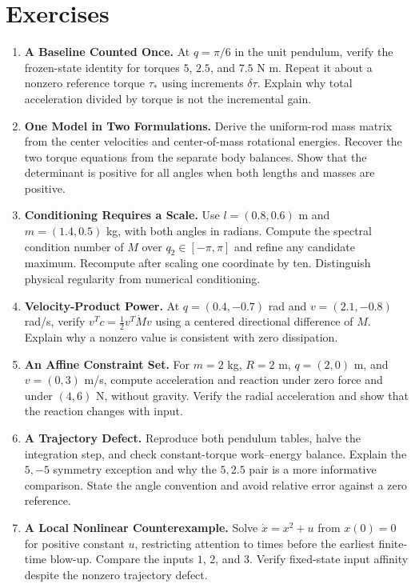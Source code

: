 \section{Exercises}

\begin{enumerate}
\item \textbf{A Baseline Counted Once.} At $q=\pi/6$ in the unit pendulum, verify the frozen-state identity for torques $5$, $2.5$, and $7.5$ N m. Repeat it about a nonzero reference torque $\tau_*$ using increments $\delta\tau$. Explain why total acceleration divided by torque is not the incremental gain.
\item \textbf{One Model in Two Formulations.} Derive the uniform-rod mass matrix from the center velocities and center-of-mass rotational energies. Recover the two torque equations from the separate body balances. Show that the determinant is positive for all angles when both lengths and masses are positive.
\item \textbf{Conditioning Requires a Scale.} Use $l=(0.8,0.6)$ m and $m=(1.4,0.5)$ kg, with both angles in radians. Compute the spectral condition number of $M$ over $q_2\in[-\pi,\pi]$ and refine any candidate maximum. Recompute after scaling one coordinate by ten. Distinguish physical regularity from numerical conditioning.
\item \textbf{Velocity-Product Power.} At $q=(0.4,-0.7)$ rad and $v=(2.1,-0.8)$ rad/s, verify $v^Tc=\tfrac12v^T\dot Mv$ using a centered directional difference of $M$. Explain why a nonzero value is consistent with zero dissipation.
\item \textbf{An Affine Constraint Set.} For $m=2$ kg, $R=2$ m, $q=(2,0)$ m, and $v=(0,3)$ m/s, compute acceleration and reaction under zero force and under $(4,6)$ N, without gravity. Verify the radial acceleration and show that the reaction changes with input.
\item \textbf{A Trajectory Defect.} Reproduce both pendulum tables, halve the integration step, and check constant-torque work--energy balance. Explain the $5,-5$ symmetry exception and why the $5,2.5$ pair is a more informative comparison. State the angle convention and avoid relative error against a zero reference.
\item \textbf{A Local Nonlinear Counterexample.} Solve $\dot x=x^2+u$ from $x(0)=0$ for positive constant $u$, restricting attention to times before the earliest finite-time blow-up. Compare the inputs $1$, $2$, and $3$. Verify fixed-state input affinity despite the nonzero trajectory defect.

\end{enumerate}
